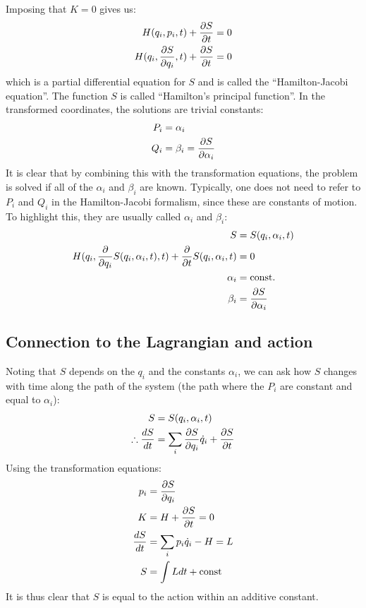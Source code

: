Imposing that $K=0$ gives us:
\begin{align}
H(q_i,p_i,t)+\frac{\partial S}{\partial t}&=0\nonumber\\
H(q_i,\frac{\partial S}{\partial q_i},t)+\frac{\partial S}{\partial t}&=0
\end{align}
which is a partial differential equation for $S$ and is called the ``Hamilton-Jacobi equation''. The function $S$ is called ``Hamilton's principal function''. In the transformed coordinates, the solutions are trivial constants:
\begin{align}
P_i&=\alpha_i\nonumber\\
Q_i&=\beta_i =\frac{\partial S}{\partial \alpha_i}
\end{align}
It is clear that by combining this with the transformation equations, the problem is solved if all of the $\alpha_i$ and $\beta_i$ are known. Typically, one does not need to refer to $P_i$ and $Q_i$ in the Hamilton-Jacobi formalism, since these are constants of motion. To highlight this, they are usually called $\alpha_i$ and $\beta_i$:
\begin{align}
S&=S(q_i,\alpha_i,t)\nonumber\\
H(q_i,\frac{\partial }{\partial q_i}S(q_i,\alpha_i,t),t)+\frac{\partial }{\partial t}S(q_i,\alpha_i,t)&=0\nonumber\\
\alpha_i &=\text{const.}\nonumber\\
\beta_i &=\frac{\partial S}{\partial \alpha_i}
\end{align}

\subsection{Connection to the Lagrangian and action}

Noting that $S$ depends on the $q_i$ and the constants $\alpha_i$, we can ask how $S$ changes with time along the path of the system (the path where the $P_i$ are constant and equal to $\alpha_i$):
\begin{align}
S&=S(q_i,\alpha_i,t)\nonumber\\
\therefore\frac{dS}{dt}&=\sum_i\frac{\partial S}{\partial q_i}\dot q_i +\frac{\partial S}{\partial t}
\end{align}
Using the transformation equations:
\begin{align}
p_i&=\frac{\partial S}{\partial q_i}\nonumber\\
K&=H+\frac{\partial S}{\partial t}=0\nonumber\\
\frac{dS}{dt}&=\sum_ip_i\dot q_i -H=L\nonumber\\
S&=\int L dt+ \text{const}
\end{align}
It is thus clear that $S$ is equal to the action within an additive constant.



